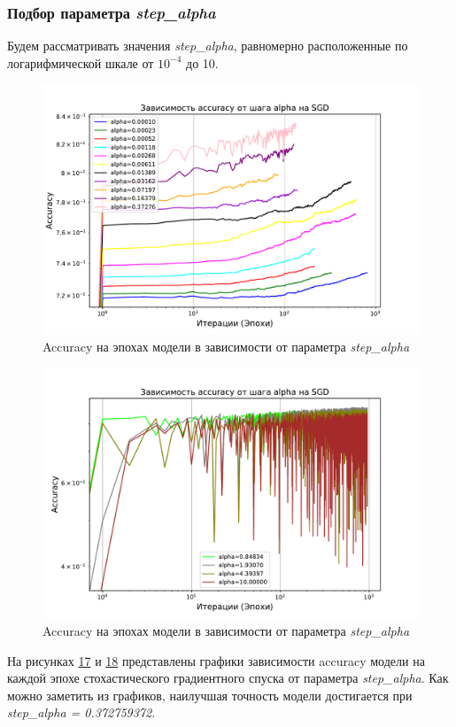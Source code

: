 \documentclass[14pt]{extarticle}
\begin{document}
\subsubsection{Подбор параметра \textit{step\_alpha}}

Будем рассматривать значения \textit{step\_alpha}, равномерно расположенные по логарифмической шкале от $ 10^{-4} $ до 10.

\begin{figure}[H]
    \centering
    \includegraphics[width=0.7\linewidth]
    {exp_5_acc_alpha_1.pdf}
    \caption{Accuracy на эпохах модели в зависимости от параметра \textit{step\_alpha}}
    \label{fig:exp_5_acc_alpha_1}
\end{figure}

\begin{figure}[H]
    \centering
    \includegraphics[width=0.7\linewidth]
    {exp_5_acc_alpha_2.pdf}
    \caption{Accuracy на эпохах модели в зависимости от параметра \textit{step\_alpha}}
    \label{fig:exp_5_acc_alpha_2}
\end{figure}

На рисунках \hyperref[fig:exp_5_acc_alpha_1]{17} и \hyperref[fig:exp_5_acc_alpha_2]{18} представлены графики зависимости accuracy модели на каждой эпохе стохастического градиентного спуска от параметра \textit{step\_alpha}. Как можно заметить из графиков, наилучшая точность модели достигается при \textit{step\_alpha = 0.372759372}.
\end{document}
